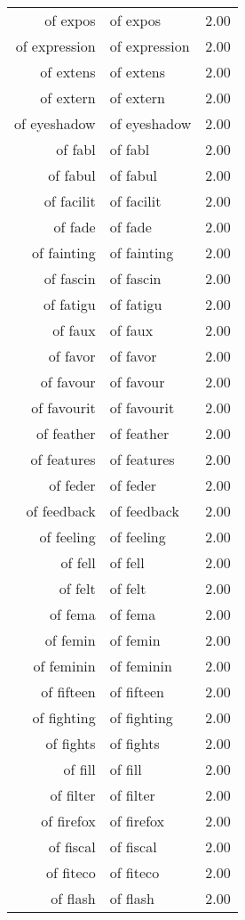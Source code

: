 \begin{table}[ht]
\begin{tabular}{rlr}
  of expos & of expos & 2.00 \\ 
  of expression & of expression & 2.00 \\ 
  of extens & of extens & 2.00 \\ 
  of extern & of extern & 2.00 \\ 
  of eyeshadow & of eyeshadow & 2.00 \\ 
  of fabl & of fabl & 2.00 \\ 
  of fabul & of fabul & 2.00 \\ 
  of facilit & of facilit & 2.00 \\ 
  of fade & of fade & 2.00 \\ 
  of fainting & of fainting & 2.00 \\ 
  of fascin & of fascin & 2.00 \\ 
  of fatigu & of fatigu & 2.00 \\ 
  of faux & of faux & 2.00 \\ 
  of favor & of favor & 2.00 \\ 
  of favour & of favour & 2.00 \\ 
  of favourit & of favourit & 2.00 \\ 
  of feather & of feather & 2.00 \\ 
  of features & of features & 2.00 \\ 
  of feder & of feder & 2.00 \\ 
  of feedback & of feedback & 2.00 \\ 
  of feeling & of feeling & 2.00 \\ 
  of fell & of fell & 2.00 \\ 
  of felt & of felt & 2.00 \\ 
  of fema & of fema & 2.00 \\ 
  of femin & of femin & 2.00 \\ 
  of feminin & of feminin & 2.00 \\ 
  of fifteen & of fifteen & 2.00 \\ 
  of fighting & of fighting & 2.00 \\ 
  of fights & of fights & 2.00 \\ 
  of fill & of fill & 2.00 \\ 
  of filter & of filter & 2.00 \\ 
  of firefox & of firefox & 2.00 \\ 
  of fiscal & of fiscal & 2.00 \\ 
  of fiteco & of fiteco & 2.00 \\ 
  of flash & of flash & 2.00 \\ 

\end{tabular}
\end{table}
